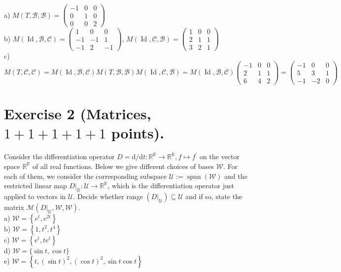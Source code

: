 \documentclass[10pt]{article}
\numberwithin{equation}{section}
\begin{document}
a) $M(T, \mathcal{B}, \mathcal{B}) = \begin{pmatrix}
	-1 & 0 & 0 \\
	0 & 1 & 0 \\
	0 & 0 & 2
\end{pmatrix}$ \\
b) $M(\operatorname{Id}, \mathcal{B}, \mathcal{C}) = \begin{pmatrix}
	1 & 0 & 0 \\
	-1 & -1& 1 \\
	-1& 2 & -1
\end{pmatrix}$, 
$M(\operatorname{Id}, \mathcal{C}, \mathcal{B}) = 	\begin{pmatrix}
	1 & 0 & 0 \\
	2 & 1 & 1 \\
	3 & 2 & 1
\end{pmatrix} $   \\
c) $M(T, \mathcal{C}, \mathcal{C}) = M(\operatorname{Id}, \mathcal{B}, \mathcal{C}) M(T, \mathcal{B}, \mathcal{B})M(\operatorname{Id}, \mathcal{C}, \mathcal{B}) = M(\operatorname{Id}, \mathcal{B}, \mathcal{C})\begin{pmatrix}
	-1 & 0 & 0 \\
	2 & 1 & 1 \\
	6 & 4 & 2
\end{pmatrix} = \begin{pmatrix}
-1& 0 & 0 \\
5  & 3 & 1 \\
-1 & -2 & 0
\end{pmatrix}
$
\section{Exercise 2 (Matrices, $1+1+1+1+1$ points).}
Consider the differentiation operator $D=\mathrm{d} / \mathrm{d} t: \mathbb{R}^{\mathbb{R}} \rightarrow \mathbb{R}^{\mathbb{R}}, f \mapsto f^{\prime}$ on the vector space $\mathbb{R}^{\mathbb{R}}$ of all real functions. Below we give different choices of bases $\mathcal{W}$. For each of them, we consider the corresponding subspace $\mathcal{U}:=\operatorname{span}(\mathcal{W})$ and the restricted linear map $\left.D\right|_{\mathcal{U}}: \mathcal{U} \rightarrow \mathbb{R}^{\mathbb{R}}$, which is the differentiation operator just applied to vectors in $\mathcal{U}$. Decide whether range $\left(\left.D\right|_{\mathcal{U}}\right) \subseteq \mathcal{U}$ and if so, state the matrix $\mathcal{M}\left(\left.D\right|_{\mathcal{U}}, \mathcal{W}, \mathcal{W}\right)$.\\
a) $\mathcal{W}=\left\{e^t, e^{2 t}\right\}$\\
b) $\mathcal{W}=\left\{1, t^2, t^4\right\}$\\
c) $\mathcal{W}=\left\{e^t, t e^t\right\}$\\
d) $\mathcal{W}=\{\sin t, \cos t\}$\\
e) $\mathcal{W}=\left\{t,(\sin t)^2,(\cos t)^2, \sin t \cos t\right\}$\\
\end{document}

